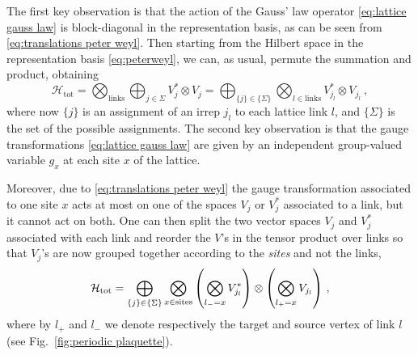 The first key observation is that the action of the Gauss' law operator \eqref{eq:lattice gauss law} is block-diagonal in the representation basis, as can be seen from \eqref{eq:translations peter weyl}.
Then starting from the Hilbert space in the representation basis \eqref{eq:peterweyl}, we can, as usual, permute the summation and product, obtaining
\begin{equation}
    \label{eq:hilbert space permuted}
    \mathcal{H}_{\text{tot}} = \bigotimes_{\mathrm{links}} \bigoplus_{j \in \Sigma} V_j^* \otimes V_j=\bigoplus_{\{j\} \in \{\Sigma\}} \bigotimes_{l \in \mathrm{links}}  V_{j_l}^* \otimes V_{j_l} \ ,
\end{equation}
where now $\{j\}$ is an assignment of an irrep $j_l$ to each lattice link $l$, and $\{\Sigma\}$ is the set of the possible assignments.
The second key observation is that the gauge transformations \eqref{eq:lattice gauss law} are given by an independent group-valued variable $g_x$ at each site $x$ of the lattice.

Moreover, due to \eqref{eq:translations peter weyl} the gauge transformation associated to one site $x$ acts at most on one of the spaces $V_j$ or $V_j^*$ associated to a link, but it cannot act on both.
One can then split the two vector spaces $V_j$ and $V_j^*$ associated with each link and reorder the $V$'s in the tensor product over links so that $V_j$'s are now grouped together according to the \textit{sites} and not the links,
\begin{equation}
    \mathcal{H}_{\text{tot}} = \bigoplus_{\{j\} \in \{\Sigma\}} \bigotimes_{x \in \mathrm{sites}} \pqty{\bigotimes_{l_-=x} V_{j_l}^*} \otimes \pqty{\bigotimes_{l_+=x} V_{j_l} }\ ,
\end{equation}
where by $l_+$ and $l_-$ we denote respectively the target and source vertex of link $l$ (see Fig.~\ref{fig:periodic plaquette}).

\medskip

